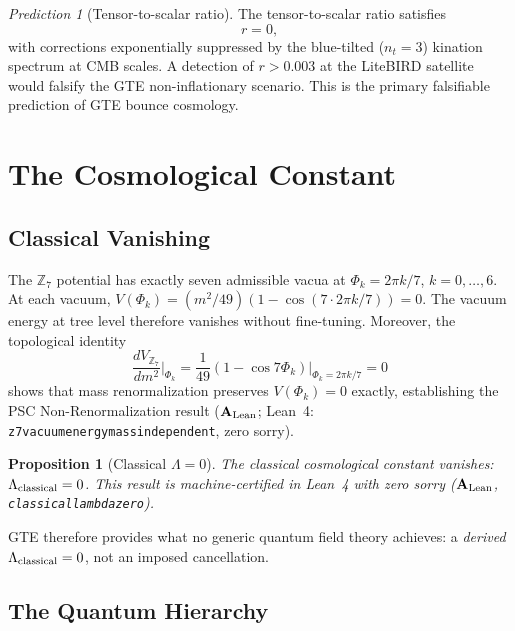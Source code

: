 \documentclass[11pt]{article}
\newtheorem{proposition}[theorem]{Proposition}
\theoremstyle{remark}
\newtheorem{prediction}[theorem]{Prediction}
\newcommand{\ZS}{\mathbb{Z}_7}
\newcommand{\lean}[1]{%
  \penalty-100
  \begingroup\def\_{\textunderscore\allowbreak}\texttt{#1}\endgroup}
\newcommand{\CatAL}{\ensuremath{\textbf{A}_{\rm Lean}}}
\begin{document}
\begin{prediction}[Tensor-to-scalar ratio]
\label{pred:r}
The tensor-to-scalar ratio satisfies
\begin{equation}
  r = 0,
\end{equation}
with corrections exponentially suppressed by the blue-tilted ($n_t=3$) kination
spectrum at CMB scales.  A detection of $r > 0.003$ at the LiteBIRD satellite would
falsify the GTE non-inflationary scenario.  This is the primary falsifiable prediction
of GTE bounce cosmology.
\end{prediction}

\section{The Cosmological Constant}
\label{sec:cc}

\subsection{Classical Vanishing}
\label{sec:lambda_classical}

The $\ZS$ potential has exactly seven admissible vacua at $\Phi_k = 2\pi k/7$,
$k=0,\ldots,6$.  At each vacuum, $V(\Phi_k) = (m^2/49)(1-\cos(7\cdot 2\pi k/7)) = 0$.
The vacuum energy at tree level therefore vanishes without fine-tuning.  Moreover, the
topological identity
\begin{equation}
  \frac{dV_{\ZS}}{dm^2}\Big|_{\Phi_k} = \frac{1}{49}(1-\cos 7\Phi_k)\Big|_{\Phi_k=2\pi k/7} = 0
\end{equation}
shows that mass renormalization preserves $V(\Phi_k)=0$ exactly, establishing the
PSC Non-Renormalization result ($\CatAL$; Lean~4: \lean{z7\_vacuum\_energy\_mass\_independent},
zero sorry).

\begin{proposition}[Classical $\Lambda = 0$]
\label{prop:Lambda_classical}
The classical cosmological constant vanishes: $\Lambda_{\rm classical}=0$.  This
result is machine-certified in Lean~4 with zero sorry ($\CatAL$, \lean{classical\_lambda\_zero}).
\end{proposition}

GTE therefore provides what no generic quantum field theory achieves: a \emph{derived}
$\Lambda_{\rm classical}=0$, not an imposed cancellation.

\subsection{The Quantum Hierarchy}
\label{sec:hierarchy}
\end{document}
